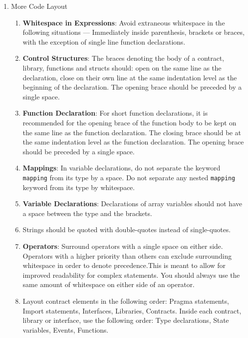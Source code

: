 \begin{enumerate}
\item More Code Layout
    \begin{enumerate}
    \item\textbf{Whitespace in Expressions}: Avoid extraneous whitespace in the following situations —  Immediately inside parenthesis, brackets or braces, with the exception of single line function declarations.
    \item\textbf{Control Structures}: The braces denoting the body of a contract, library, functions and structs should: open on the same line as the declaration, close on their own line at the same indentation level as the beginning of the declaration. The opening brace should be preceded by a single space.
    \item\textbf{Function Declaration}: For short function declarations, it is recommended for the opening brace of the function body to be kept on the same line as the function declaration. The closing brace should be at the same indentation level as the function declaration. The opening brace should be preceded by a single space.
    \item\textbf{Mappings}: In variable declarations, do not separate the keyword \verb|mapping| from its type by a space. Do not separate any nested \verb|mapping| keyword from its type by whitespace.
    \item\textbf{Variable Declarations}: Declarations of array variables should not have a space between the type and the brackets.
    \item Strings should be quoted with double-quotes instead of single-quotes.
    \item\textbf{Operators}: Surround operators with a single space on either side. Operators with a higher priority than others can exclude surrounding whitespace in order to denote precedence.This is meant to allow for improved readability for complex statements. You should always use the same amount of whitespace on either side of an operator.
    \item Layout contract elements in the following order: Pragma statements, Import statements, Interfaces, Libraries, Contracts. Inside each contract, library or interface, use the following order: Type declarations, State variables, Events, Functions.
    \end{enumerate}


\end{enumerate}
